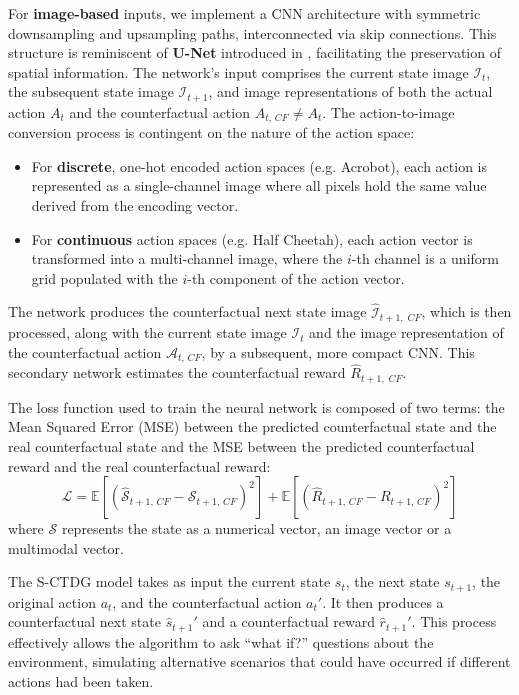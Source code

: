 For \textbf{image-based} inputs, we implement a CNN
architecture with symmetric downsampling and upsampling paths,
interconnected via skip connections. This structure is reminiscent
of \textbf{U-Net} introduced in \cite{ronneberger2015u},
facilitating the preservation of
spatial information.
The network's input comprises the current state image $\mathcal{I}_{t}$,
the subsequent state image $\mathcal{I}_{t+1}$,
and image representations of both the actual action $A_t$
and the counterfactual action $A_{t,\, CF} \neq A_t$. The action-to-image
conversion process is contingent on the nature of the action space:
\begin{itemize}
    \item For \textbf{discrete}, one-hot encoded action spaces (e.g. Acrobot),
    each action is represented as a single-channel image where all
    pixels hold the same value derived from the encoding vector.
    \item For \textbf{continuous} action spaces (e.g. Half Cheetah), 
    each action vector is transformed into a multi-channel image,
    where the $i$-th channel is a uniform grid populated with the
    $i$-th component of the action vector.
\end{itemize}
The network produces the counterfactual next state image
$\hat{\mathcal{I}}_{t+1,\; CF}$, which
is then processed, along with the current state image
$\mathcal{I}_{t}$ and the image representation of the counterfactual
action $\mathcal{A}_{t,\, CF}$, by a subsequent, more compact CNN.
This secondary network estimates the counterfactual reward $\hat{R}_{t+1,\; CF}$.

The loss function used to train the neural network is composed of
two terms: the Mean Squared Error (MSE) between the predicted
counterfactual state and the real counterfactual state and the
MSE between the predicted counterfactual reward and the real
counterfactual reward:
\begin{equation}
    \mathcal{L} = \mathbb{E} \left[ \left( \hat{\mathcal{S}}_{t+1,\, CF} - \mathcal{S}_{t+1,\, CF} \right)^2 \right] +
    \mathbb{E} \left[ \left( \hat{R}_{t+1,\, CF} - R_{t+1,\, CF} \right)^2 \right]
\end{equation}
where $\mathcal{S}$ represents the state as a numerical vector,
an image vector or a multimodal vector.

The S-CTDG model takes as input the current state $s_t$,
the next state $s_{t+1}$, the original action $a_t$,
and the counterfactual action $a_t'$. It then produces a counterfactual
next state $\hat{s}_{t+1}'$ and a counterfactual reward $\hat{r}_{t+1}'$.
This process effectively allows the algorithm to ask ``what if?''
questions about the environment, simulating alternative scenarios
that could have occurred if different actions
had been taken. 

